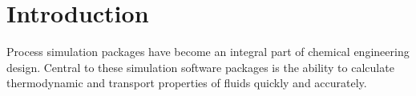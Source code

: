 \documentclass[12pt]{UoAthesis}
\begin{document}






\chapter{Introduction}

Process simulation packages have become an integral part of chemical
engineering design. Central to these simulation software packages is
the ability to calculate thermodynamic and transport properties of
fluids quickly and accurately. 
\end{document}
